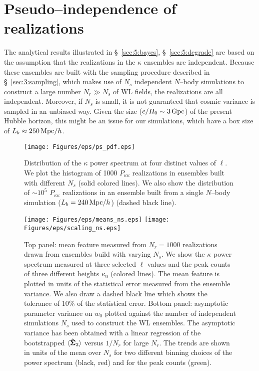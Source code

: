 \section{Pseudo--independence of realizations}
\label{sec:5:pseudo}
The analytical results illustrated in \S~\ref{sec:5:bayes}, \S~\ref{sec:5:degrade} are based on the assumption that the realizations in the $\kappa$ ensembles are independent. Because these ensembles are built with the sampling procedure described in \S~\ref{sec:3:sampling}, which makes use of $N_s$ independent $N$--body simulations to construct a large number $N_r\gg N_s$ of WL fields, the realizations are all independent. Moreover, if $N_s$ is small, it is not guaranteed that cosmic variance is sampled in an unbiased way. Given the size ($c/H_0\sim 3\,{\rm Gpc}$) of the present Hubble horizon, this might be an issue for our simulations, which have a box size of $L_b\approx 250\,{\rm Mpc}/h$. 
%
\begin{figure}
\begin{center}
\texttt{[image: Figures/eps/ps\_pdf.eps]}
\end{center}
\caption{Distribution of the $\kappa$ power spectrum at four distinct values of $\ell$. We plot the histogram of 1000 $P_{\kappa\kappa}$ realizations in ensembles built with different $N_s$ (solid colored lines). We also show the distribution of $\sim 10^5$ $P_{\kappa\kappa}$ realizations in an ensemble built from a single $N$--body simulation ($L_b=240\,{\rm Mpc}/h$) (dashed black line).}
\label{fig:5:pspdf}
\end{figure}
%
\begin{figure}
\begin{center}
\texttt{[image: Figures/eps/means\_ns.eps]} \texttt{[image: Figures/eps/scaling\_ns.eps]}
\end{center}
\caption{Top panel: mean feature measured from $N_r=1000$ realizations drawn from ensembles build with varying $N_s$. We show the $\kappa$ power spectrum measured at three selected $\ell$ values and the peak counts of three different heights $\kappa_0$ (colored lines). The mean feature is plotted in units of the statistical error measured from the ensemble variance. We also draw a dashed black line which shows the tolerance of 10\% of the statistical error. Bottom panel: asymptotic parameter variance on $w_0$ plotted against the number of independent simulations $N_s$ used to construct the WL ensembles. The asymptotic variance has been obtained with a linear regression of the bootstrapped $\langle\mathbf{\hat{\Sigma}}_2\rangle$ versus $1/N_r$ for large $N_r$. The trends are shown in units of the mean over $N_s$ for two different binning choices of the power spectrum (black, red) and for the peak counts (green).}
\label{fig:5:mcns}
\end{figure}
